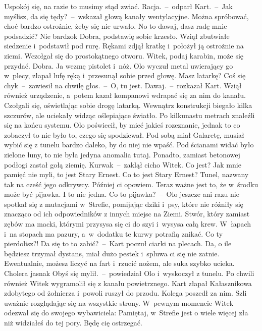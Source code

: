 \documentclass[../MAIN.tex]{subfiles}
\begin{document}
\xx Uspokój się, na razie to musimy stąd zwiać.
\xx Racja.~--~odparł Kart.~--~Jak myślisz, da się tędy?~--~wskazał głową kanały wentylacyjne.
\xx Można spróbować, choć bardzo ostrożnie, żeby się nie urwało.
\xx No to dawaj, dasz radę mnie podsadzić?
\xx Nie bardzo\3k
\xx Dobra, podstawię sobie krzesło.
\qm
%
Wziął zbutwiałe siedzenie i~podstawił pod rurę. Rękami zdjął kratkę i~położył ją ostrożnie na ziemi. Wczołgał się do prostokątnego otworu.
%
\sd
\xx Witek, podaj karabin, może się przydać.
\xx Dobra. Ja wezmę pistolet i~nóż.
\qm
 Olo wyczuł metal uwierający go w~plecy, złapał lufę ręką i~przesunął sobie przed głowę.
\sd
\xx Masz latarkę?
\xx Coś się chy\3k~--~zawiesił na chwilę głos.~--~O, tu jest.
\xx Dawaj.~--~rozkazał Kart.
\qm
 Wziął również urządzenie, a~potem kazał kompanowi wdrapać się za nim do kanału. Czołgali się, oświetlając sobie drogę latarką. Wewnątrz konstrukcji biegało kilka szczurów, ale uciekały widząc oślepiające światło.
Po kilkunastu metrach znaleźli się na końcu systemu. Olo poświecił, by mieć jakieś rozeznanie, jednak to co zobaczył to nie było to, czego się spodziewał. Pod sobą miał Galaretę, musiał wybić się z tunelu bardzo daleko, by do niej nie wpaść. Pod ścianami widać było zielone łuny, to nie była jedyna anomalia tutaj. Ponadto, zamiast betonowej podłogi zastał gołą ziemię.
%
\sd
\xx Kurwa\3k~--~zaklął cicho Witek.
\xx Co jest?
\xx Jak mnie pamięć nie myli, to jest Stary Ernest.
\xx Co to jest Stary Ernest?
\xx Tunel, nazwany tak na cześć jego odkrywcy. Później ci opowiem. Teraz ważne jest to, że w~środku może być pijawka. I to nie jedna.
\xx Co to pijawka?~--~Olo jeszcze ani razu nie spotkał się z mutacjami w~Strefie, pomijając dziki i~psy, które nie różniły się znacząco od ich odpowiedników z innych miejsc na Ziemi.
\xx Stwór, który zamiast zębów ma macki, którymi przysysa się ci do szyi i~wysysa całą krew. W~łapach i~na stopach ma pazury, a~w~dodatku te kurwy potrafią znikać.
\xx Co ty pierdolisz?! Da się to to zabić?~--~Kart poczuł ciarki na plecach.
\xx Da, o ile będziesz trzymał dystans, miał dużo pestek i~spluwa ci się nie zatnie. Ewentualnie, możesz liczyć na fart i~rzucić nożem, ale suka szybko ucieka.
\xx Cholera jasna\3k Obyś się mylił.~--~powiedział Olo i~wyskoczył z tunelu.
\qm
Po chwili również Witek wygramolił się z kanału powietrznego. Kart złapał Kałasznikowa zdobytego od żołnierza i~powoli ruszył do przodu. Kolega poszedł za nim. Szli uważnie rozglądając się na wszystkie strony. W~pewnym momencie Witek odezwał się do swojego wybawiciela:
\sd
\xx Pamiętaj, w~Strefie jest o wiele więcej zła niż widziałeś do tej pory. Będę cię ostrzegać.
\end{document}

